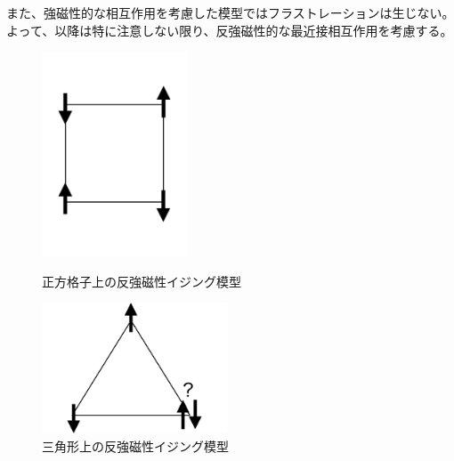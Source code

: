 \documentclass[12pt,titlepage,dvipdfmx]{jarticle}
\begin{document}
また、強磁性的な相互作用を考慮した模型ではフラストレーションは生じない。
よって、以降は特に注意しない限り、反強磁性的な最近接相互作用を考慮する。

\begin{figure}[H]
 \begin{minipage}{0.5\hsize}
  \begin{center}
   \includegraphics[width=43mm]{figure/square_ising_afm.pdf}
  \end{center}
  \caption{正方格子上の反強磁性イジング模型}
 \end{minipage}
 \begin{minipage}{0.5\hsize}
  \begin{center}
   \includegraphics[width=55mm]{figure/triangle_ising_afm.pdf}
  \end{center}
  \caption{三角形上の反強磁性イジング模型}
 \end{minipage}
\end{figure}
   
\end{document}
